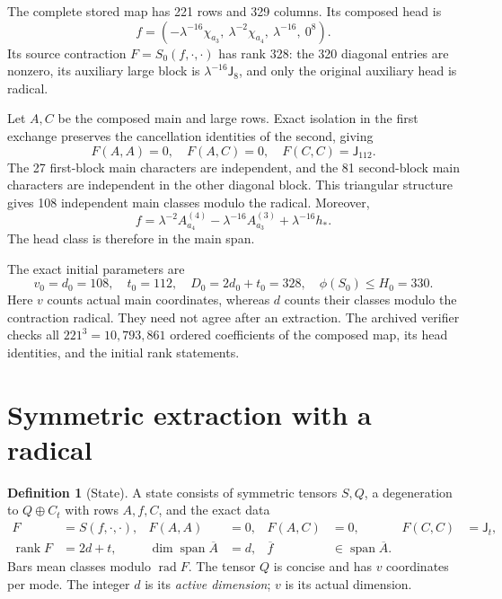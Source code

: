\documentclass[11pt]{article}
\theoremstyle{definition}\newtheorem{definition}[theorem]{Definition}
\theoremstyle{remark}\newtheorem{remark}[theorem]{Remark}
\newcommand{\rad}{\operatorname{rad}}
\newcommand{\rank}{\operatorname{rank}}
\newcommand{\Span}{\operatorname{span}}
\newcommand{\J}{\mathsf J}
\begin{document}
The complete stored map has 221 rows and 329 columns. Its composed head is
\begin{equation}\label{eq:initial-head}
 f=(-\lambda^{-16}\chi_{a_3},\ \lambda^{-2}\chi_{a_4},\ \lambda^{-16},\ 0^8).
\end{equation}
Its source contraction $F=S_0(f,\cdot,\cdot)$ has rank 328: the 320 diagonal entries are nonzero, its auxiliary large block is $\lambda^{-16}\J_8$, and only the original auxiliary head is radical.

Let $A,C$ be the composed main and large rows. Exact isolation in the first exchange preserves the cancellation identities of the second, giving
\begin{equation}\label{eq:initial-exact}
 F(A,A)=0,\quad F(A,C)=0,\quad F(C,C)=\J_{112}.
\end{equation}
The 27 first-block main characters are independent, and the 81 second-block main characters are independent in the other diagonal block. This triangular structure gives 108 independent main classes modulo the radical. Moreover,
\[
 f=\lambda^{-2}A_{a_4}^{(4)}-\lambda^{-16}A_{a_3}^{(3)}+\lambda^{-16}h_*.
\]
The head class is therefore in the main span.

The exact initial parameters are
\begin{equation}\label{eq:initial-data}
 v_0=d_0=108,\quad t_0=112,\quad D_0=2d_0+t_0=328,\quad
 \phi(S_0)\leq H_0=330.
\end{equation}
Here $v$ counts actual main coordinates, whereas $d$ counts their classes modulo the contraction radical. They need not agree after an extraction. The archived verifier checks all $221^3=10{,}793{,}861$ ordered coefficients of the composed map, its head identities, and the initial rank statements.

\section{Symmetric extraction with a radical}\label{sec:extraction}

\begin{definition}[State]\label{def:state}
A state consists of symmetric tensors $S,Q$, a degeneration to $Q\oplus C_t$ with rows $A,f,C$, and the exact data
\begin{align}
 F&=S(f,\cdot,\cdot),&
 F(A,A)&=0,& F(A,C)&=0,& F(C,C)&=\J_t,\label{eq:state1}\\
 \rank F&=2d+t,&
 \dim\Span\overline A&=d,&
 \overline f&\in\Span\overline A.&&\label{eq:state2}
\end{align}
Bars mean classes modulo $\rad F$. The tensor $Q$ is concise and has $v$ coordinates per mode. The integer $d$ is its \emph{active dimension}; $v$ is its actual dimension.
\end{definition}
\end{document}
